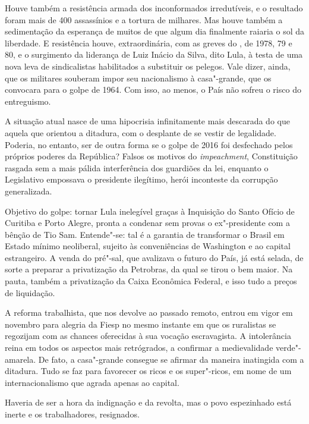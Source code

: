 Houve também a resistência armada dos inconformados irredutíveis, e o
resultado foram mais de 400 assassínios e a tortura de milhares. Mas
houve também a sedimentação da esperança de muitos de que algum dia
finalmente raiaria o sol da liberdade. E resistência houve,
extraordinária, com as greves do , de 1978, 79 e 80, e o surgimento
da liderança de Luiz Inácio da Silva, dito Lula, à testa de uma nova
leva de sindicalistas habilitados a substituir os pelegos. Vale dizer,
ainda, que os militares souberam impor seu nacionalismo à casa"-grande,
que os convocara para o golpe de 1964. Com isso, ao menos, o País não
sofreu o risco do entreguismo.

A situação atual nasce de uma hipocrisia infinitamente mais descarada do
que aquela que orientou a ditadura, com o desplante de se vestir de
legalidade. Poderia, no entanto, ser de outra forma se o golpe de 2016
foi desfechado pelos próprios poderes da República? Falsos os motivos do
\emph{impeachment}, Constituição rasgada sem a mais pálida interferência
dos guardiões da lei, enquanto o Legislativo empossava o presidente
ilegítimo, herói inconteste da corrupção generalizada.

Objetivo do golpe: tornar Lula inelegível graças à Inquisição do Santo
Ofício de Curitiba e Porto Alegre, pronta a condenar sem provas o
ex"-presidente com a bênção de Tio Sam. Entende"-se: tal é a garantia de
transformar o Brasil em Estado mínimo neoliberal, sujeito às
conveniências de Washington e ao capital estrangeiro. A venda do
pré"-sal, que avalizava o futuro do País, já está selada, de sorte a
preparar a privatização da Petrobras, da qual se tirou o bem maior. Na
pauta, também a privatização da Caixa Econômica Federal, e isso tudo a
preços de liquidação.

A reforma trabalhista, que nos devolve ao passado remoto, entrou em
vigor em novembro para alegria da Fiesp no mesmo instante em que os
ruralistas se regozijam com as chances oferecidas à sua vocação
escravagista. A intolerância reina em todos os aspectos mais
retrógrados, a confirmar a medievalidade verde"-amarela. De fato, a
casa"-grande consegue se afirmar da maneira inatingida com a ditadura.
Tudo se faz para favorecer os ricos e os super"-ricos, em nome de um
internacionalismo que agrada apenas ao capital.

Haveria de ser a hora da indignação e da revolta, mas o povo espezinhado
está inerte e os trabalhadores, resignados.



